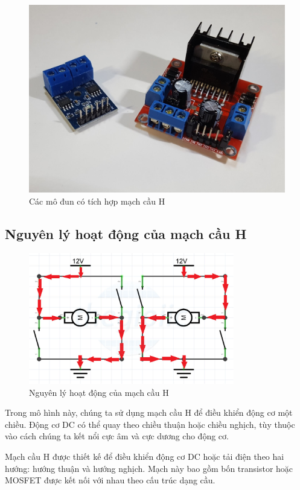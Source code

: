 \documentclass{article}
\begin{document}
\begin{figure}[H]
    \centering
    \includegraphics[width=1\textwidth]{image/cauhcurcuit.png}
    \caption{Các mô đun có tích hợp mạch cầu H}
    \label{fig:hbridge}
\end{figure}
\cleardoublepage
\subsection{Nguyên lý hoạt động của mạch cầu H}
\begin{figure}[H]
    \centering
    \includegraphics[width=0.8\textwidth]{image/cauhwork.png}
    \caption{Nguyên lý hoạt động của mạch cầu H}
    \label{fig:hbridge}
\end{figure}
Trong mô hình này, chúng ta sử dụng mạch cầu H để điều khiển động cơ một chiều. Động cơ DC có thể quay theo chiều thuận hoặc chiều nghịch, tùy thuộc vào cách chúng ta kết nổi cực âm và cực dương cho động cơ.

Mạch cầu H được thiết kế để điều khiển động cơ DC hoặc tải điện theo hai hướng: hướng thuận và hướng nghịch. Mạch này bao gồm bốn transistor hoặc MOSFET được kết nối với nhau theo cấu trúc dạng cầu.
\end{document}
